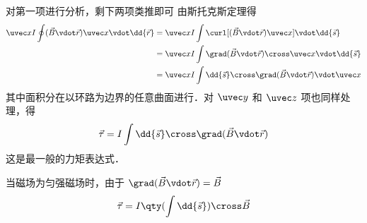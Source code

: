 对第一项进行分析，剩下两项类推即可
由斯托克斯定理得
\begin{equation}
\begin{aligned} 
\uvec x I \oint (\vec B \vdot \vec r)\uvec x \vdot \dd{\vec r}  &= \uvec x I \int \curl [ ( \vec B \vdot \vec r)\uvec x] \vdot \dd{\vec s} \\
&= \uvec x I \int \grad (\vec B \vdot \vec r) \cross \uvec x \vdot \dd{\vec s} \\
&= \uvec x I \int \dd{\vec s}  \cross \grad (\vec B \vdot \vec r) \vdot \uvec x 
\end{aligned} 
\end{equation}
其中面积分在以环路为边界的任意曲面进行．对 $\uvec y$ 和 $\uvec z$ 项也同样处理，得
\begin{equation}
\vec \tau = I \int \dd{\vec s}\cross\grad(\vec B\vdot\vec r)
\end{equation}
这是最一般的力矩表达式．

当磁场为匀强磁场时，由于 $\grad (\vec B \vdot \vec r) = \vec B$
\begin{equation}
\vec \tau = I \qty(\int \dd{\vec s}) \cross \vec B
\end{equation}







